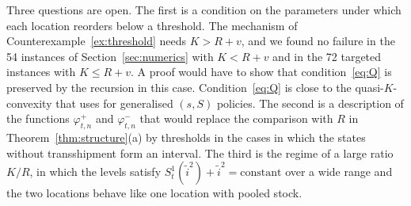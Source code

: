 \documentclass[11pt]{article}
\theoremstyle{definition}
\begin{document}
Three questions are open. The first is a condition on the parameters under which each location reorders below a threshold. The mechanism of Counterexample~\ref{ex:threshold} needs $K>R+v$, and we found no failure in the 54 instances of Section~\ref{sec:numerics} with $K<R+v$ and in the 72 targeted instances with $K\le R+v$. A proof would have to show that condition~\eqref{eq:Q} is preserved by the recursion in this case. Condition~\eqref{eq:Q} is close to the quasi-$K$-convexity that \citet{porteus1971optimality} uses for generalised $(s,S)$ policies. The second is a description of the functions $\varphi^{+}_{t,n}$ and $\varphi^{-}_{t,n}$ that would replace the comparison with $R$ in Theorem~\ref{thm:structure}(a) by thresholds in the cases in which the states without transshipment form an interval. The third is the regime of a large ratio $K/R$, in which the levels satisfy $S^1_t(\tilde{i}^2)+\tilde{i}^2=\text{constant}$ over a wide range and the two locations behave like one location with pooled stock.



\end{document}
